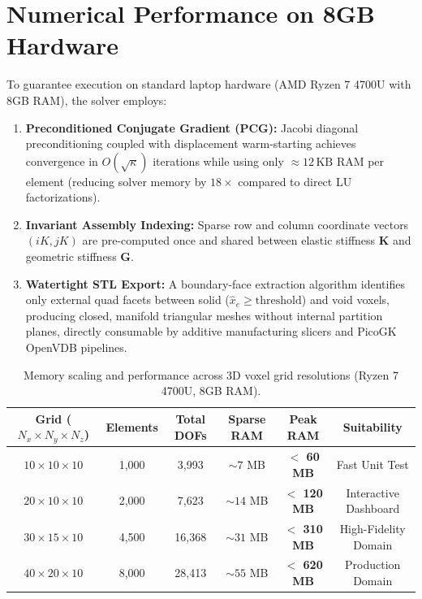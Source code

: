 \documentclass[11pt, a4paper]{article}
\begin{document}
\section{Numerical Performance on 8GB Hardware}
To guarantee execution on standard laptop hardware (AMD Ryzen 7 4700U with 8GB RAM), the solver employs:
\begin{enumerate}
    \item \textbf{Preconditioned Conjugate Gradient (PCG):} Jacobi diagonal preconditioning coupled with displacement warm-starting achieves convergence in $O(\sqrt{\kappa})$ iterations while using only $\approx 12\,\text{KB}$ RAM per element (reducing solver memory by $18\times$ compared to direct LU factorizations).
    \item \textbf{Invariant Assembly Indexing:} Sparse row and column coordinate vectors $(iK, jK)$ are pre-computed once and shared between elastic stiffness $\mathbf{K}$ and geometric stiffness $\mathbf{G}$.
    \item \textbf{Watertight STL Export:} A boundary-face extraction algorithm identifies only external quad facets between solid ($\hat{x}_e \ge \text{threshold}$) and void voxels, producing closed, manifold triangular meshes without internal partition planes, directly consumable by additive manufacturing slicers and PicoGK OpenVDB pipelines.
\end{enumerate}

\begin{table}[h!]
\centering
\footnotesize
\setlength{\tabcolsep}{3pt}
\caption{Memory scaling and performance across 3D voxel grid resolutions (Ryzen 7 4700U, 8GB RAM).}
\vspace{4pt}
\begin{tabular}{|cccccc|}
\hline
\textbf{Grid ($N_x \times N_y \times N_z$)} & \textbf{Elements} & \textbf{Total DOFs} & \textbf{Sparse RAM} & \textbf{Peak RAM} & \textbf{Suitability} \\
\hline
$10 \times 10 \times 10$ & 1,000 & 3,993 & $\sim 7$ MB & \textbf{$<$ 60 MB} & Fast Unit Test \\
$20 \times 10 \times 10$ & 2,000 & 7,623 & $\sim 14$ MB & \textbf{$<$ 120 MB} & Interactive Dashboard \\
$30 \times 15 \times 10$ & 4,500 & 16,368 & $\sim 31$ MB & \textbf{$<$ 310 MB} & High-Fidelity Domain \\
$40 \times 20 \times 10$ & 8,000 & 28,413 & $\sim 55$ MB & \textbf{$<$ 620 MB} & Production Domain \\
\hline
\end{tabular}
\end{table}
\end{document}
